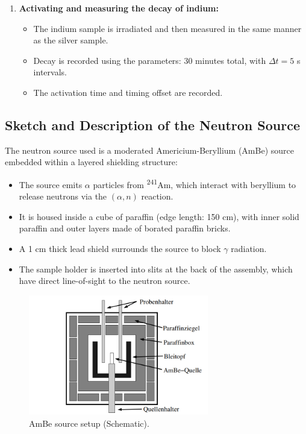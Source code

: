\documentclass[12pt,a4paper]{article}
\begin{document}
\begin{enumerate}
  \item \textbf{Activating and measuring the decay of indium:}
  \begin{itemize}
    \item The indium sample is irradiated and then measured in the same manner as the silver sample.
    \item Decay is recorded using the parameters: 30 minutes total, with $\Delta t = 5$ s intervals.
    \item The activation time and timing offset are recorded.
  \end{itemize}
\end{enumerate}

\subsection{Sketch and Description of the Neutron Source}

The neutron source used is a moderated Americium-Beryllium (AmBe) source embedded within a layered shielding structure:

\begin{itemize}
  \item The source emits $\alpha$ particles from \textsuperscript{241}Am, which interact with beryllium to release neutrons via the $(\alpha,n)$ reaction.
  \item It is housed inside a cube of paraffin (edge length: 150 cm), with inner solid paraffin and outer layers made of borated paraffin bricks.
  \item A 1 cm thick lead shield surrounds the source to block $\gamma$ radiation.
  \item The sample holder is inserted into slits at the back of the assembly, which have direct line-of-sight to the neutron source.
\end{itemize}

\begin{figure}[H]
  \centering
  \includegraphics[width=0.7\textwidth]{Pictures/AmBe Source.png}
  \caption{AmBe source setup (Schematic).}
  \label{fig:AmBe}
\end{figure}
\end{document}
